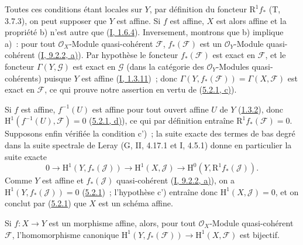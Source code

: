 Toutes ces conditions étant locales sur $Y$, par définition du foncteur
$\mathrm{R}^1f_*$ (T, 3.7.3), on peut supposer que $Y$ est affine. Si $f$
est affine, $X$ est alors affine et la propriété b) n'est autre que
(\hyperref[I.1.6.4-fr]{I, 1.6.4}). Inversement, montrons que b) implique
a)~: pour tout $\mathcal{O}_X$-Module quasi-cohérent $\mathcal{F}$,
$f_*(\mathcal{F})$ est un $\mathcal{O}_Y$-Module quasi-cohérent
(\hyperref[I.9.2.2-fr]{I, 9.2.2, a)}). Par hypothèse le foncteur
$f_*(\mathcal{F})$ est exact en $\mathcal{F}$, et le foncteur
$\Gamma(Y,\mathcal{G})$ est exact en $\mathcal{G}$ (dans la catégorie des
$\mathcal{O}_Y$-Modules quasi-cohérents) puisque $Y$ est affine
(\hyperref[I.1.3.11-fr]{I, 1.3.11})~; donc
$\Gamma(Y,f_*(\mathcal{F}))=\Gamma(X,\mathcal{F})$ est exact en
$\mathcal{F}$, ce qui prouve notre assertion en vertu de
(\hyperref[II.5.2.1-fr]{5.2.1, c)}).

Si $f$ est affine, $f^{-1}(U)$ est affine pour tout ouvert affine $U$ de
$Y$ (\hyperref[II.1.3.2-fr]{1.3.2}), donc
$\mathrm{H}^1(f^{-1}(U),\mathcal{F})=0$
(\hyperref[II.5.2.1-fr]{5.2.1, d)}), ce qui par définition entraîne
$\mathrm{R}^1f_*(\mathcal{F})=0$. Supposons enfin vérifiée la condition
c')~; la suite exacte des termes de bas degré dans la suite spectrale de
Leray (G, II, 4.17.1 et I, 4.5.1) donne en particulier la suite exacte
\[
  0\to\mathrm{H}^1(Y,f_*(\mathcal{J}))\to
  \mathrm{H}^1(X,\mathcal{J})\to
  \mathrm{H}^0(Y,\mathrm{R}^1f_*(\mathcal{J})).
\]
Comme $Y$ est affine et $f_*(\mathcal{J})$ quasi-cohérent
(\hyperref[I.9.2.2-fr]{I, 9.2.2, a)}), on a
$\mathrm{H}^1(Y,f_*(\mathcal{J}))=0$
(\hyperref[II.5.2.1-fr]{5.2.1})~; l'hypothèse c') entraîne donc
$\mathrm{H}^1(X,\mathcal{J})=0$, et on conclut par
(\hyperref[II.5.2.1-fr]{5.2.1}) que $X$ est un schéma affine.

\begin{corollary}[5.2.3]
\label{II.5.2.3-fr}
Si $f:X\to Y$ est un morphisme affine, alors, pour tout
$\mathcal{O}_X$-Module quasi-cohérent $\mathcal{F}$, l'homomorphisme
canonique
$\mathrm{H}^1(Y,f_*(\mathcal{F}))\to\mathrm{H}^1(X,\mathcal{F})$ est
bijectif.
\end{corollary}

